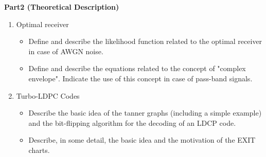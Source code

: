 \documentclass[11pt]{article}
\begin{document}
{\bf Part2 (Theoretical Description)} \\
\begin{enumerate}
\item Optimal receiver
\begin{itemize}
\item Define and describe the likelihood function related to the optimal receiver in case of AWGN noise.
\item Define and describe the equations related to the concept of "complex envelope". Indicate the use of this concept in case of pass-band signals.
\end{itemize}

\item Turbo-LDPC Codes
\begin{itemize}
\item Describe the basic idea of the tanner graphs (including a simple example) and the bit-flipping algorithm for the decoding of an LDCP code.
\item Describe, in some detail, the basic idea and the motivation of the EXIT charts.
\end{itemize}


\end{enumerate}
\end{document}
